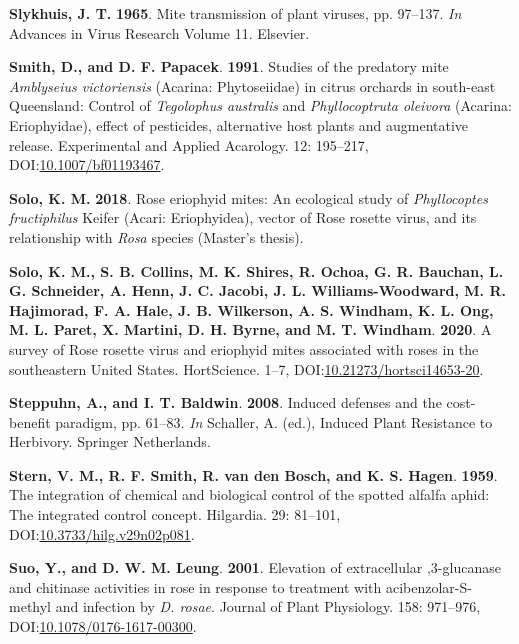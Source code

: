 \documentclass[12pt,final,CPage]{ufthesis}
\newlength{\cslhangindent}
\newenvironment{CSLReferences}[2] %
{%
	\setlength{\parindent}{0pt}
	\ifodd #1 \everypar{\setlength{\hangindent}{\cslhangindent}}\ignorespaces\fi
	\ifnum #2 > 0
	\setlength{\parskip}{#2\baselineskip}
	\fi
}%
{}
\begin{document}
{\begin{CSLReferences}{1}{0}
  \leavevmode{}%
  \textbf{Slykhuis, J. T.} \textbf{1965}. Mite transmission of plant viruses, pp. 97--137. \emph{In} Advances in Virus Research Volume 11. Elsevier.

  \leavevmode{}%
  \textbf{Smith, D., and D. F. Papacek}. \textbf{1991}. Studies of the predatory mite {\emph{Amblyseius victoriensis}} ({{Acarina}: {Phytoseiidae}}) in citrus orchards in south-east {Queensland}: Control of {\emph{Tegolophus australis}} and {\emph{Phyllocoptruta oleivora}} ({{Acarina}: {Eriophyidae}}), effect of pesticides, alternative host plants and augmentative release. Experimental and Applied Acarology. 12: 195--217, DOI:\href{https://doi.org/10.1007/bf01193467}{10.1007/bf01193467}.

  \leavevmode{}%
  \textbf{Solo, K. M.} \textbf{2018}. Rose eriophyid mites: An ecological study of {\emph{Phyllocoptes fructiphilus}} {Keifer} {({Acari}: {Eriophyidea})}, vector of {Rose rosette virus}, and its relationship with {\emph{Rosa}} species (Master's thesis).

  \leavevmode{}%
  \textbf{Solo, K. M., S. B. Collins, M. K. Shires, R. Ochoa, G. R. Bauchan, L. G. Schneider, A. Henn, J. C. Jacobi, J. L. Williams-Woodward, M. R. Hajimorad, F. A. Hale, J. B. Wilkerson, A. S. Windham, K. L. Ong, M. L. Paret, X. Martini, D. H. Byrne, and M. T. Windham}. \textbf{2020}. A survey of {Rose rosette virus} and eriophyid mites associated with roses in the southeastern {United States}. {HortScience}. 1--7, DOI:\href{https://doi.org/10.21273/hortsci14653-20}{10.21273/hortsci14653-20}.

  \leavevmode{}%
  \textbf{Steppuhn, A., and I. T. Baldwin}. \textbf{2008}. Induced defenses and the cost-benefit paradigm, pp. 61--83. \emph{In} Schaller, A. (ed.), Induced Plant Resistance to Herbivory. Springer Netherlands.

  \leavevmode{}%
  \textbf{Stern, V. M., R. F. Smith, R. van den Bosch, and K. S. Hagen}. \textbf{1959}. The integration of chemical and biological control of the spotted alfalfa aphid: The integrated control concept. Hilgardia. 29: 81--101, DOI:\href{https://doi.org/10.3733/hilg.v29n02p081}{10.3733/hilg.v29n02p081}.

  \leavevmode{}%
  \textbf{Suo, Y., and D. W. M. Leung}. \textbf{2001}. Elevation of extracellular ,3-glucanase and chitinase activities in rose in response to treatment with acibenzolar-{S}-methyl and infection by {\emph{D. rosae}}. Journal of Plant Physiology. 158: 971--976, DOI:\href{https://doi.org/10.1078/0176-1617-00300}{10.1078/0176-1617-00300}.


\end{CSLReferences}}
\end{document}
